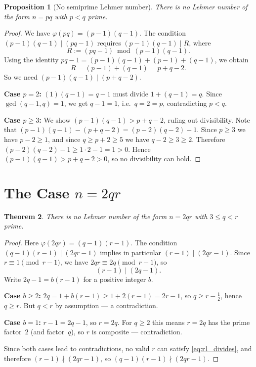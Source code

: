 \documentclass[12pt,a4paper]{amsart}
\newtheorem{theorem}{Theorem}[section]
\newtheorem{proposition}[theorem]{Proposition}
\theoremstyle{definition}
\newcommand{\euler}{\varphi}
\begin{document}
\begin{proposition}[No semiprime Lehmer number]
\label{prop:semiprime}
There is no Lehmer number of the form $n = pq$ with $p < q$ prime.
\end{proposition}

\begin{proof}
We have $\euler(pq) = (p-1)(q-1)$.  The condition $(p-1)(q-1) \mid (pq-1)$
requires $(p-1)(q-1) \mid R$, where
\[
  R := (pq - 1) \bmod (p-1)(q-1).
\]
Using the identity $pq - 1 = (p-1)(q-1) + (p-1) + (q-1)$, we obtain
\[
  R = (p - 1) + (q - 1) = p + q - 2.
\]
So we need $(p-1)(q-1) \mid (p + q - 2)$.

\textbf{Case $p = 2$:} $(1)(q-1) = q - 1$ must divide $1 + (q-1) = q$.
Since $\gcd(q-1, q) = 1$, we get $q - 1 = 1$, i.e.\ $q = 2 = p$, contradicting
$p < q$.

\textbf{Case $p \ge 3$:} We show $(p-1)(q-1) > p+q-2$, ruling out divisibility.
Note that $(p-1)(q-1) - (p+q-2) = (p-2)(q-2) - 1$.
Since $p \ge 3$ we have $p - 2 \ge 1$, and since $q \ge p + 2 \ge 5$ we have $q - 2 \ge 3 \ge 2$.
Therefore $(p-2)(q-2) - 1 \ge 1 \cdot 2 - 1 = 1 > 0$.
Hence $(p-1)(q-1) > p+q-2 > 0$, so no divisibility can hold.
\end{proof}

\section{The Case \texorpdfstring{$n = 2qr$}{n = 2qr}}
\label{sec:2qr}

\begin{theorem}
\label{thm:2qr}
There is no Lehmer number of the form $n = 2qr$ with $3 \le q < r$ prime.
\end{theorem}

\begin{proof}
Here $\euler(2qr) = (q-1)(r-1)$.  The condition $(q-1)(r-1) \mid (2qr - 1)$
implies in particular $(r-1) \mid (2qr - 1)$.  Since $r \equiv 1 \pmod{r-1}$,
we have $2qr \equiv 2q \pmod{r-1}$, so
\begin{equation}
  (r - 1) \mid (2q - 1).
  \label{eq:r1_divides}
\end{equation}
Write $2q - 1 = b(r-1)$ for a positive integer $b$.

\medskip
\noindent\textbf{Case $b \ge 2$:}
$2q = 1 + b(r-1) \ge 1 + 2(r-1) = 2r - 1$, so $q \ge r - \tfrac{1}{2}$,
hence $q \ge r$.  But $q < r$ by assumption — a contradiction.

\medskip
\noindent\textbf{Case $b = 1$:}
$r - 1 = 2q - 1$, so $r = 2q$.  For $q \ge 2$ this means $r = 2q$ has the
prime factor~$2$ (and factor~$q$), so $r$ is composite — contradiction.

\medskip
Since both cases lead to contradictions, no valid $r$ can satisfy
\eqref{eq:r1_divides}, and therefore $(r-1) \nmid (2qr - 1)$, so
$(q-1)(r-1) \nmid (2qr-1)$.
\end{proof}
\end{document}

